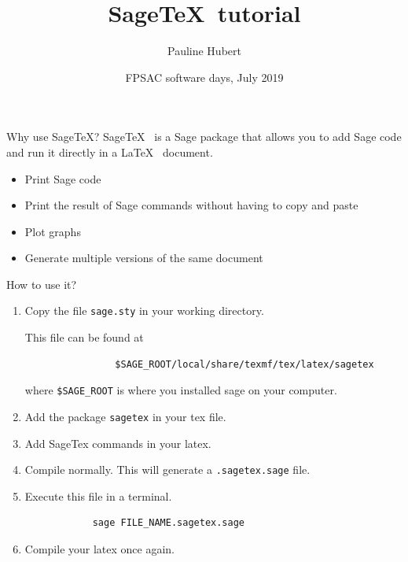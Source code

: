 \documentclass{beamer}
\title{Sage\TeX ~tutorial}
\author{Pauline Hubert}
\date{FPSAC software days, July 2019}
\begin{document}
	\maketitle
	
	\begin{frame}{Why use Sage\TeX ?}
	Sage\TeX~ is a Sage package that allows you to add Sage code and run it directly in a \LaTeX~ document. \newline \pause
	
	\begin{itemize}
		\item Print Sage code
		\item Print the result of Sage commands without having to copy and paste
		\item Plot graphs
		\item Generate multiple versions of the same document
	\end{itemize}
	\end{frame}

	\begin{frame}[fragile]{How to use it?}
		\begin{enumerate}
			\item Copy the file \texttt{sage.sty} in your working directory. 
			
			This file can be found at 
			\begin{verbatim}
				$SAGE_ROOT/local/share/texmf/tex/latex/sagetex
			\end{verbatim}
			where \texttt{\$SAGE\_ROOT} is where you installed sage on your computer.
			\item Add the package \texttt{sagetex} in your tex file.
			\item Add SageTex commands in your latex.
			\item Compile normally. This will generate a \texttt{.sagetex.sage} file. 
			\item Execute this file in a terminal.
			\begin{verbatim}
			sage FILE_NAME.sagetex.sage
			\end{verbatim}
			\item Compile your latex once again. 
			 
		\end{enumerate}
	\end{frame}
\end{document}
